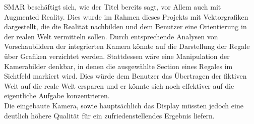 \ac{SMAR} beschäftigt sich, wie der Titel bereits sagt, vor Allem auch mit Augmented Reality. Dies wurde im Rahmen dieses Projekts mit Vektorgrafiken dargestellt, die die Realität nachbilden und dem Benutzer eine Orientierung in der realen Welt vermitteln sollen. Durch entsprechende Analysen von Vorschaubildern der integrierten Kamera könnte auf die Darstellung der Regale über Grafiken verzichtet werden. Stattdessen wäre eine Manipulation der Kamerabilder denkbar, in denen die ausgewählte Section eines Regales im Sichtfeld markiert wird. Dies würde dem Benutzer das Übertragen der fiktiven Welt auf die reale Welt ersparen und er könnte sich noch effektiver auf die eigentliche Aufgabe konzentrieren.\\
Die eingebaute Kamera, sowie hauptsächlich das Display müssten jedoch eine deutlich höhere Qualität für ein zufriedenstellendes Ergebnis liefern.\\

